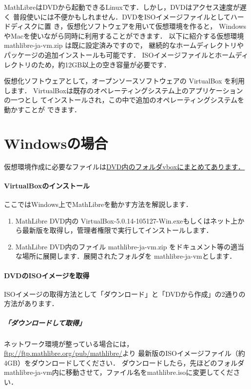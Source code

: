 \documentclass[a4j]{ltjsarticle}
\newcommand{\vboxwin}{VirtualBox-5.0.14-105127-Win.exe}
\newcommand{\vm}{mathlibre-ja-vm}
\begin{document}
MathLibreはDVDから起動できるLinuxです．しかし，DVDはアクセス速度が遅く
普段使いには不便かもしれません．DVDをISOイメージファイルとしてハードディスクに置
き，仮想化ソフトウェアを用いて仮想環境を作ると，
WindowsやMacを使いながら同時に利用することができます．
以下に紹介する仮想環境 \vm.zip は既に設定済みですので，
継続的なホームディレクトリやパッケージの追加インストールも可能です．
ISOイメージファイルとホームディレクトリのため，約12GB以上の空き容量が必要です．

仮想化ソフトウェアとして，オープンソースソフトウェアの VirtualBox を利用します．
VirtualBoxは既存のオペレーティングシステム上のアプリケーションの一つとし
てインストールされ，この中で追加のオペレーティングシステムを動かすことが
できます．

\section{Windowsの場合}
仮想環境作成に必要なファイルは\underline{DVD内のフォルダvboxにまとめてあります．}\paragraph{VirtualBoxのインストール}
ここではWindows上でMathLibreを動かす方法を解説します．
\begin{enumerate}
 \item MathLibre DVD内の \vboxwin もしくはネット上から最新版を取得し，管理者権限で実行してインストールします．
 \item MathLibre DVD内のファイル \vm.zip をドキュメント等の適当な場所に展開します．展開されたフォルダを \vm とします．
\end{enumerate}

\paragraph{DVDのISOイメージを取得}

ISOイメージの取得方法として「ダウンロード」と「DVDから作成」の2通りの方法があります．
\subparagraph{「ダウンロードして取得」}

ネットワーク環境が整っている場合には，
\url{ftp://ftp.mathlibre.org/pub/mathlibre/}より
最新版のISOイメージファイル（約4GB）をダウンロードしてください．
ダウンロードしたら，先ほどのフォルダ \vm 内に移動させて，ファイル名をmathlibre.isoに変更してください．
\end{document}
